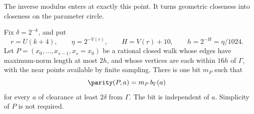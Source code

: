 The inverse modulus enters at exactly this point. It turns geometric
closeness into closeness on the parameter circle.

\begin{lemma}\label{lem:factor}
Fix $\delta=2^{-k}$, and put
\begin{equation}
 r=U(k+4),\qquad
 \eta=2^{-V(r)},\qquad H=V(r)+10,\qquad h=2^{-H}=\eta/1024.
 \label{eq:scale}
\end{equation}
Let $P=(x_0,\ldots,x_{s-1},x_s=x_0)$ be a rational closed walk
whose edges have maximum-norm length at most $2h$, and whose
vertices are each within $16h$ of $\Gamma$, with the near points
available by finite sampling. There is one bit $m_P$ such that
\begin{equation}
 \parity(P,a)=m_P\,b_\Gamma(a)
 \label{eq:factor}
\end{equation}
for every $a$ of clearance at least $2\delta$ from $\Gamma$.
The bit is independent of $a$. Simplicity of $P$ is not required.
\end{lemma}

